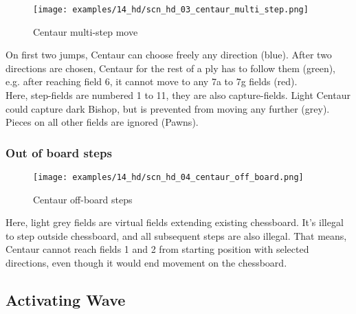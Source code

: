 \noindent
\begin{figure}[!h]
\texttt{[image: examples/14\_hd/scn\_hd\_03\_centaur\_multi\_step.png]}
\caption{Centaur multi-step move}
\label{fig:scn_hd_03_centaur_multi_step}
\end{figure}

On first two jumps, Centaur can choose freely any direction (blue). After
two directions are chosen, Centaur for the rest of a ply has to follow
them (green), e.g. after reaching field 6, it cannot move to any 7a to 7g
fields (red). \\
Here, step-fields are numbered 1 to 11, they are also capture-fields. Light
Centaur could capture dark Bishop, but is prevented from moving any further
(grey). Pieces on all other fields are ignored (Pawns).

\clearpage %

\subsubsection*{Out of board steps}

\vspace*{-0.05\textwidth}
\noindent
\begin{figure}[!h]
\texttt{[image: examples/14\_hd/scn\_hd\_04\_centaur\_off\_board.png]}
\caption{Centaur off-board steps}
\label{fig:scn_hd_04_centaur_off_board}
\end{figure}

Here, light grey fields are virtual fields extending existing chessboard.
It's illegal to step outside chessboard, and all subsequent steps are also
illegal. That means, Centaur cannot reach fields 1 and 2 from starting
position with selected directions, even though it would end movement on the
chessboard.

\clearpage %

\subsection*{Activating Wave}

